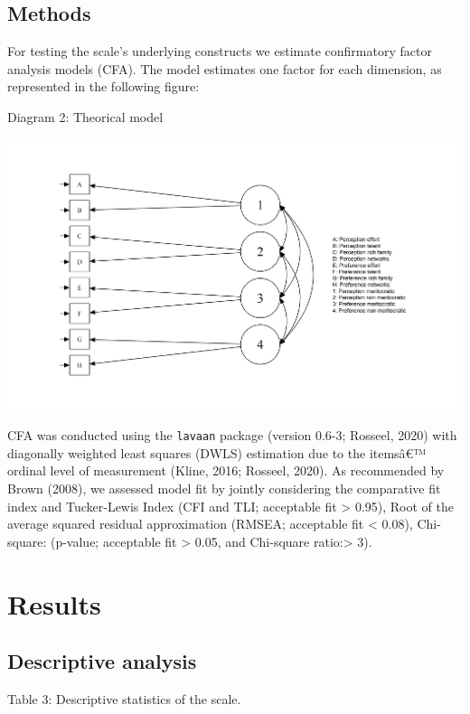 \documentclass[
]{article}
\begin{document}
\hypertarget{methods}{%
\subsection{Methods}\label{methods}}

For testing the scale's underlying constructs we estimate confirmatory
factor analysis models (CFA). The model estimates one factor for each
dimension, as represented in the following figure:

Diagram 2: Theorical model

\includegraphics{../output/images/meas01.png}

CFA was conducted using the \texttt{lavaan} package (version 0.6-3;
Rosseel, 2020) with diagonally weighted least squares (DWLS) estimation
due to the itemsâ€™ ordinal level of measurement (Kline, 2016; Rosseel,
2020). As recommended by Brown (2008), we assessed model fit by jointly
considering the comparative fit index and Tucker-Lewis Index (CFI and
TLI; acceptable fit \textgreater{} 0.95), Root of the average squared
residual approximation (RMSEA; acceptable fit \textless{} 0.08),
Chi-square: (p-value; acceptable fit \textgreater{} 0.05, and Chi-square
ratio:\textgreater{} 3).

\hypertarget{results}{%
\section{Results}\label{results}}

\hypertarget{descriptive-analysis}{%
\subsection{Descriptive analysis}\label{descriptive-analysis}}

Table 3: Descriptive statistics of the scale.
\end{document}
